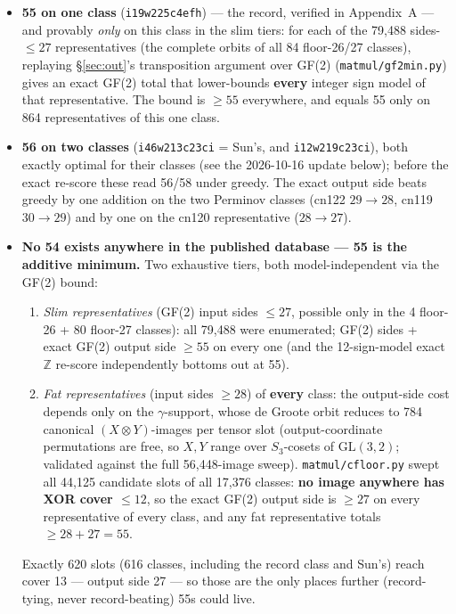 \documentclass[10pt]{article}
\begin{document}
\begin{itemize}
\item \textbf{55 on one class} (\texttt{i19w225c4efh}) --- the record,
  verified in Appendix~A --- and provably \emph{only} on this class in
  the slim tiers: for each of the 79{,}488 sides-$\le 27$
  representatives (the complete orbits of all 84 floor-26/27 classes),
  replaying \S\ref{sec:out}'s transposition argument over GF(2)
  (\texttt{matmul/gf2min.py}) gives an exact GF(2) total that
  lower-bounds \textbf{every} integer sign model of that
  representative. The bound is $\ge 55$ everywhere, and equals 55 only
  on 864 representatives of this one class.
\item \textbf{56 on two classes} (\texttt{i46w213c23ci} =
  Sun's, and \texttt{i12w219c23ci}), both exactly optimal for their
  classes (see the 2026-10-16 update below); before the exact re-score these
  read 56/58 under greedy. The exact output side beats greedy by one
  addition on the two Perminov classes (cn122 $29\to28$, cn119
  $30\to29$) and by one on the cn120 representative ($28\to27$).
\item \textbf{No 54 exists anywhere in the published database ---
  55 is the additive minimum.} Two exhaustive tiers, both
  model-independent via the GF(2) bound:
  \begin{enumerate}
  \item \emph{Slim representatives} (GF(2) input sides $\le 27$,
    possible only in the 4 floor-26 + 80 floor-27 classes): all
    79{,}488 were enumerated; GF(2) sides + exact GF(2) output side
    $\ge 55$ on every one (and the 12-sign-model exact $\mathbb{Z}$
    re-score independently bottoms out at 55).
  \item \emph{Fat representatives} (input sides $\ge 28$) of
    \textbf{every} class: the output-side cost depends only on the
    $\gamma$-support, whose de Groote orbit reduces to 784 canonical
    $(X \otimes Y)$-images per tensor slot (output-coordinate
    permutations are free, so $X, Y$ range over $S_3$-cosets of
    $\mathrm{GL}(3,2)$; validated against the full 56{,}448-image
    sweep). \texttt{matmul/cfloor.py} swept all 44{,}125 candidate
    slots of all 17{,}376 classes: \textbf{no image anywhere has XOR
    cover $\le 12$}, so the exact GF(2) output side is $\ge 27$ on
    every representative of every class, and any fat representative
    totals $\ge 28 + 27 = 55$.
  \end{enumerate}
  Exactly 620 slots (616 classes, including the record class and
  Sun's) reach cover 13 --- output side 27 --- so those are the only
  places further (record-tying, never record-beating) 55s could
  live.


\end{itemize}
\end{document}
